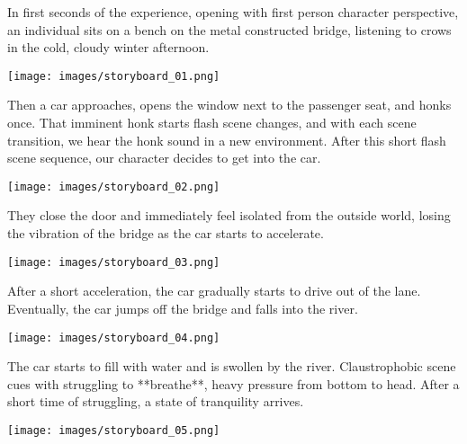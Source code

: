         In first seconds of the experience, opening with first person character perspective, an individual sits on a bench on the metal constructed bridge, listening to crows in the cold, cloudy winter afternoon.\par
 
        \begin{center}
            \texttt{[image: images/storyboard\_01.png]}
        \end{center}

        Then a car approaches, opens the window next to the passenger seat, and honks once. That imminent honk starts flash scene changes, and with each scene transition, we hear the honk sound in a new environment. After this short flash scene sequence, our character decides to get into the car.\par


        \begin{center}
            \texttt{[image: images/storyboard\_02.png]}
        \end{center}


        They close the door and immediately feel isolated from the outside world, losing the vibration of the bridge as the car starts to accelerate.\par

        \begin{center}
            \texttt{[image: images/storyboard\_03.png]}
        \end{center}

        After a short acceleration, the car gradually starts to drive out of the lane. Eventually, the car jumps off the bridge and falls into the river.\par

        \begin{center}
            \texttt{[image: images/storyboard\_04.png]}
        \end{center}

        The car starts to fill with water and is swollen by the river. Claustrophobic scene cues with struggling to **breathe**, heavy pressure from bottom to head. After a short time of struggling, a state of tranquility arrives.\par

        \begin{center}
            \texttt{[image: images/storyboard\_05.png]}
        \end{center}

